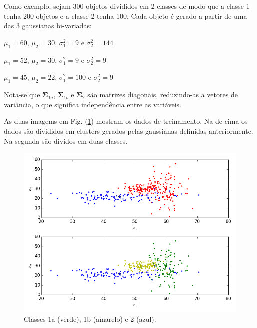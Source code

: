 \documentclass[a4paper,12pt,twocolumn]{article}
\newcommand{\figureref}[1]{Fig. (\ref{fig:#1})}
\begin{document}
Como exemplo, sejam 300 objetos divididos em 2 classes de modo que a classe 1 tenha 200 objetos e a classe 2 tenha 100. Cada objeto é gerado a partir de uma das 3 gaussianas bi-variadas:

\begin{description}\itemsep0pt
    \item[1a:] $\mu_1 = 60$, $\mu_2 = 30$, $\sigma_1^2 = 9$ e $\sigma_2^2 = 144$
    \item[1b:] $\mu_1 = 52$, $\mu_2 = 30$, $\sigma_1^2 = 9$ e $\sigma_2^2 = 9$
    \item[2:] $\mu_1 = 45$, $\mu_2 = 22$, $\sigma_1^2 = 100$ e $\sigma_2^2 = 9$
\end{description}

\noindent Nota-se que $\boldsymbol{\Sigma}_{1a}$, $\boldsymbol{\Sigma}_{1b}$ e $\boldsymbol{\Sigma}_2$ são matrizes diagonais, reduzindo-as a vetores de variância, o que significa independência entre as variáveis.

As duas imagems em \figureref{samples} mostram os dados de treinamento. Na de cima os dados são divididos em clusters gerados pelas gaussianas definidas anteriormente. Na segunda são dividos em duas classes.

\begin{figure}[ht]
    \centering
    \includegraphics[scale=0.4]{samples}
    \caption{Classes 1a (verde), 1b (amarelo) e 2 (azul).}
    \label{fig:samples}
\end{figure}
\end{document}
